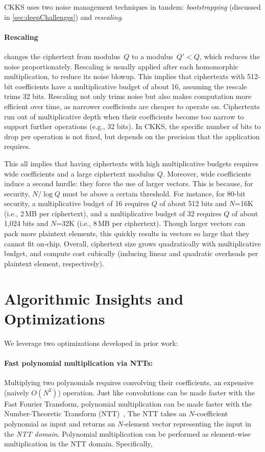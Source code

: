CKKS uses two noise management techniques in tandem: \emph{bootstrapping}
(discussed in \autoref{sec:deepChallenges}) and \emph{rescaling}.

\paragraph{Rescaling} changes the ciphertext from modulus~$Q$ to a
modulus~$Q' < Q$, which reduces the noise proportionately. Rescaling is
usually applied after each homomorphic multiplication, to reduce its noise
blowup.
This implies that ciphertexts with
512-bit coefficients have a multiplicative budget of about 16, assuming the rescale
trims 32 bits. Rescaling not only trims noise but also makes computation more
efficient over time, as narrower coefficients are cheaper to operate on.
Ciphertexts run out of multiplicative depth when their coefficients become too
narrow to support further operations (e.g., 32 bits). In CKKS, the specific
number of bits to drop per operation is not fixed, but depends on the precision
that the application requires.

This all implies that having ciphertexts with high multiplicative budgets
requires wide coefficients and a large ciphertext modulus $Q$. Moreover, wide
coefficients induce a second hurdle: they force the use of larger vectors. This
is because, for security, $N/\log Q$ must be above a certain threshold. For
instance, for 80-bit security, a multiplicative budget of 16 requires $Q$ of
about 512 bits and $N$=16K (i.e., 2\,MB per ciphertext), and a multiplicative
budget of 32 requires $Q$ of about 1,024 bits and $N$=32K (i.e., 8\,MB per
ciphertext). Though larger vectors can pack more plaintext elements, this
quickly results in vectors so large that they cannot fit on-chip. Overall,
ciphertext size grows quadratically with multiplicative budget, and compute
cost cubically (inducing linear and quadratic overheads per plaintext element,
respectively).

\section{Algorithmic Insights and Optimizations}\label{sec:algoInsights}
\label{sec:fhe_optimizations}

We leverage two optimizations developed in prior work:

\paragraph{Fast polynomial multiplication via NTTs:} Multiplying two
polynomials requires convolving their coefficients, an expensive (naively
$O(N^2)$) operation. Just like convolutions can be made faster with the Fast
Fourier Transform, polynomial multiplication can be made faster with the
Number-Theoretic Transform (NTT)~\cite{moenck1976practical}, The NTT takes an
$N$\hyp{}coefficient polynomial as input and returns an $N$\hyp{}element vector
representing the input in the \textit{NTT domain}. Polynomial multiplication
can be performed as element-wise multiplication in the NTT domain.
Specifically,

